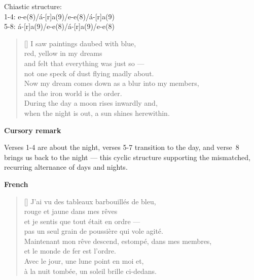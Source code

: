 \documentclass[a4paper,12pt,twoside,final]{book}
\begin{document}

\noindent Chiastic structure: \\
1-4: e-e(8)/á-[r]a(9)/e-e(8)/á-[r]a(9) \\
5-8: á-[r]a(9)/e-e(8)/á-[r]a(9)/e-e(8)

\newpage



\settowidth{\versewidth}{Now my dream comes down as a blur into my members}

\begin{verse}[\versewidth]
  I saw paintings daubed with blue, \\
  red, yellow in my dreams \\
  and felt that everything was just so ---\\
  not one speck of dust flying madly about. \\
  Now my dream comes down as a blur into my members, \\
  and the iron world is the order. \\
  During the day a moon rises inwardly and, \\
  when the night is out, a sun shines herewithin. \\
\end{verse}

\bigskip

\noindent \textbf{Cursory remark}

\medskip

Verses 1-4 are about the night, verses 5-7 transition to the day, and
verse~8 brings us back to the night --- this cyclic structure
supporting the mismatched, recurring alternance of days and
nights.

\bigskip

\noindent \textbf{French}


\settowidth{\versewidth}{Maintenant mon rêve descend, estompé, dans mes membres}

\begin{verse}[\versewidth]
  J'ai vu des tableaux barbouillés de bleu, \\
  rouge et jaune dans mes rêves \\
  et je sentis que tout était en ordre --- \\
  pas un seul grain de poussière qui vole agité. \\
  Maintenant mon rêve descend, estompé, dans mes membres, \\
  et le monde de fer est l'ordre. \\
  Avec le jour, une lune point en moi et, \\
  à la nuit tombée, un soleil brille ci-dedans. \\
\end{verse}
\end{document}
